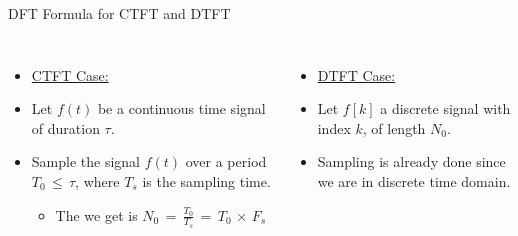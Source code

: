 \begin{frame}[t,allowframebreaks]{DFT Formula for CTFT and DTFT}

\begin{columns}

\begin{itemize}

\item \underline{CTFT Case:}

\item Let $f(t)$ be a continuous time signal of duration $\tau$.

\item Sample the signal $f(t)$ over a period $T_0 \, \leq \, \tau$, where $T_s$ is the sampling time. 

	\begin{itemize}
	\item The  we get is $N_0 \, = \, \displaystyle\frac{T_0}{T_s} \, = \, T_0 \, \times \, F_s$
	\end{itemize}
\end{itemize}


\begin{itemize}

\item \underline{DTFT Case:}

\item Let $f[k]$ a discrete signal with index $k$, of length $N_0$.

\item Sampling is already done since we are in discrete time domain.


\end{itemize}

\end{columns}

\end{frame}


